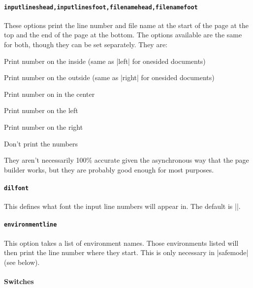 \documentclass[twoside]{scrartcl}
\begin{document}
\paragraph{\lstinline+inputlineshead,inputlinesfoot,filenamehead,filenamefoot+}

These options print the line number and file name at the start of the
page at the top and the end of the page at the bottom. 
The options available are the same for both, though they can be set separately. 
They are:
\begin{description}[labelindent=1cm]
\item[inside] Print number on the inside (same as |left| for onesided
  documents)
\item[outside] Print number on the outside (same as |right| for
  onesided documents)
\item[center] Print number on in the center
\item[left] Print number on the left
\item[right] Print number on the right
\item[off] Don't print the numbers
\end{description}

They aren't necessarily 100\% accurate given the asynchronous way that
the page builder works, but they are probably good enough for most purposes.

\paragraph{\lstinline+dilfont+}

This defines what font the input line numbers will appear in.
The default is |\ttfamily\small|.

\paragraph{\lstinline+environmentline+}

This option takes a list of environment names.
Those environments listed will then print the line number where they
start.
This is only necessary in |safemode| (see below).

\paragraph{Switches}
\end{document}
